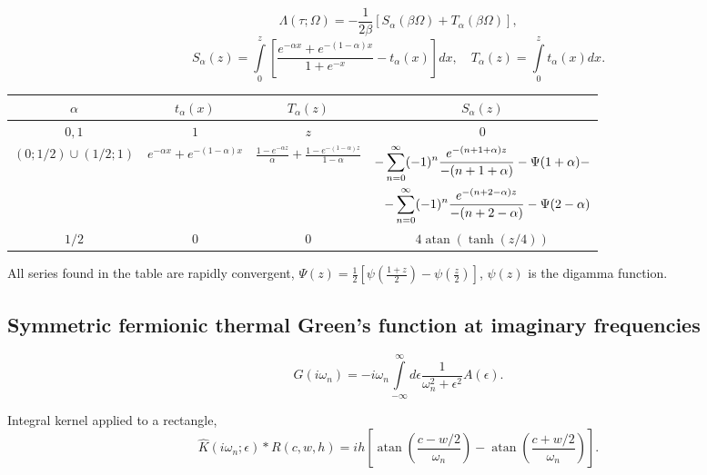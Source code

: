 \documentclass[]{article}
\DeclareMathOperator{\atan}{atan}
\begin{document}
\begin{equation}
    \Lambda(\tau;\Omega) = -\frac{1}{2\beta} \left[
    S_\alpha(\beta\Omega) + T_\alpha(\beta\Omega) \right],
\end{equation}
\begin{equation}
    S_\alpha(z) = \int\limits_0^z
    \left[\frac{e^{-\alpha x}+e^{-(1-\alpha)x}}{1+e^{-x}} - t_\alpha(x)
    \right] dx, \quad
    T_\alpha(z) = \int\limits_0^z t_\alpha(x) dx.
\end{equation}

\begin{center}
    \footnotesize
    \begin{tabular}{|c|c|c|c|}
        \hline
        $\alpha$ & $t_\alpha(x)$ & $T_\alpha(z)$ & $S_\alpha(z)$ \\
        \hline
        $0,1$ & $1$ & $z$ & $0$ \\
        \hline
        $(0;1/2)\cup(1/2;1)$ & $e^{-\alpha x}+e^{-(1-\alpha)x}$ &
        $\frac{1-e^{-\alpha z}}{\alpha}+\frac{1-e^{-(1-\alpha) z}}{1-\alpha}$ &$\begin{aligned}-\sum_{n=0}^\infty(-1)^n\frac{e^{-(n+1+\alpha)z}}{-(n+1+\alpha)}-\Psi(1+\alpha)-\\
        -\sum_{n=0}^\infty(-1)^n\frac{e^{-(n+2-\alpha)z}}{-(n+2-\alpha)}-\Psi(2-\alpha)\end{aligned}$ \\
        \hline
        $1/2$ & $0$ & $0$ & $4\atan(\tanh(z/4))$ \\
        \hline
    \end{tabular}
\end{center}
All series found in the table are rapidly convergent, $\Psi(z) = \frac{1}{2}[\psi(\frac{1+z}{2}) - \psi(\frac{z}{2})]$, $\psi(z)$ is the digamma function.

\subsection{Symmetric fermionic thermal Green's function at imaginary frequencies}
\label{fermiongfsymm_imfreq}
\begin{equation}
    G(i\omega_n) = -i\omega_n\int\limits_{-\infty}^\infty
    d\epsilon \frac{1}{\omega_n^2+\epsilon^2} A(\epsilon).
\end{equation}

Integral kernel applied to a rectangle,
\begin{equation}
    \hat K(i\omega_n;\epsilon)*R(c,w,h) =
    ih \left[
        \atan\left(\frac{c - w/2}{\omega_n}\right) -
        \atan\left(\frac{c + w/2}{\omega_n}\right)
    \right].
\end{equation}
\end{document}
